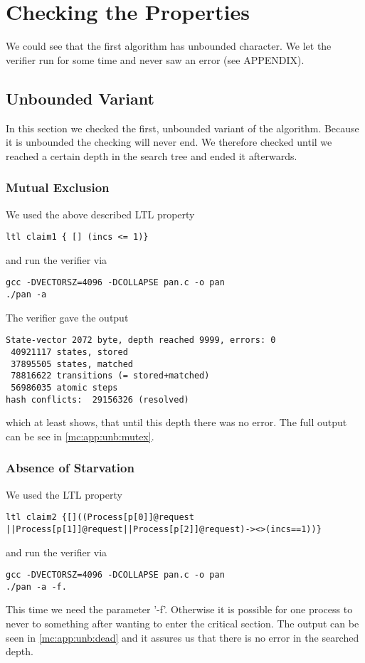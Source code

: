 \documentclass{llncs}
\begin{document}
\section{Checking the Properties}

We could see that the first algorithm has unbounded character. We let the verifier run for some time
and never saw an error (see APPENDIX).

\subsection{Unbounded Variant}

In this section we checked the first, unbounded variant of the algorithm.
Because it is unbounded the checking will never end. We therefore checked until we reached
a certain depth in the search tree and ended it afterwards.

\subsubsection{Mutual Exclusion}

We used the above described LTL property
\begin{lstlisting}
ltl claim1 { [] (incs <= 1)}
\end{lstlisting}
and run the verifier via
\begin{lstlisting}
gcc -DVECTORSZ=4096 -DCOLLAPSE pan.c -o pan
./pan -a
\end{lstlisting}

The verifier gave the output
\begin{lstlisting}
State-vector 2072 byte, depth reached 9999, errors: 0
 40921117 states, stored
 37895505 states, matched
 78816622 transitions (= stored+matched)
 56986035 atomic steps
hash conflicts:  29156326 (resolved)
\end{lstlisting}
which at least shows, that until this depth there was no error.
The full output can be see in \ref{mc:app:unb:mutex}.

\subsubsection{Absence of Starvation}

We used the LTL property
\begin{lstlisting}
ltl claim2 {[]((Process[p[0]]@request
||Process[p[1]]@request||Process[p[2]]@request)-><>(incs==1))}
\end{lstlisting}
and run the verifier via
\begin{lstlisting}
gcc -DVECTORSZ=4096 -DCOLLAPSE pan.c -o pan
./pan -a -f.
\end{lstlisting}
This time we need the parameter '-f'. Otherwise it is possible for one process to never to something after wanting to enter
the critical section. The output can be seen in \ref{mc:app:unb:dead} and it assures us that there is no error in
the searched depth.
\end{document}
